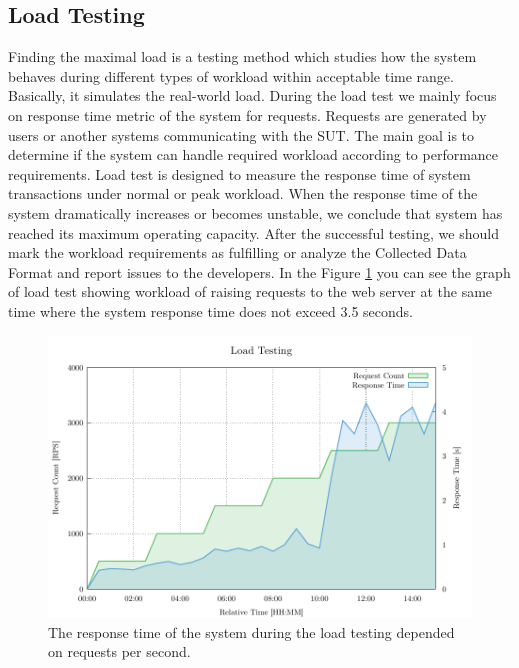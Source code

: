 \subsection*{Load Testing}
Finding the maximal load is a testing method which studies how the system behaves during different types of workload within acceptable time range. Basically, it simulates the real-world load. During the load test we mainly focus on response time metric of the system for requests. Requests are generated by users or another systems communicating with the SUT. The main goal is to determine if the system can handle required workload according to performance requirements. Load test is designed to measure the response time of system transactions under normal or peak workload. When the response time of the system dramatically increases or becomes unstable, we conclude that system has reached its maximum operating capacity. After the successful testing, we should mark the workload requirements as fulfilling or analyze the Collected Data Format and report issues to the developers. In the Figure \ref{fig:load_test} you can see the graph of load test showing workload of raising requests to the web server at the same time where the system response time does not exceed 3.5 seconds.

\begin{figure}[H]
  \centering
  \includegraphics[width=15cm]{obrazky-figures/load_testing.pdf}
  \caption{The response time of the system during the load testing depended on requests per second.}
  \label{fig:load_test}
\end{figure}


